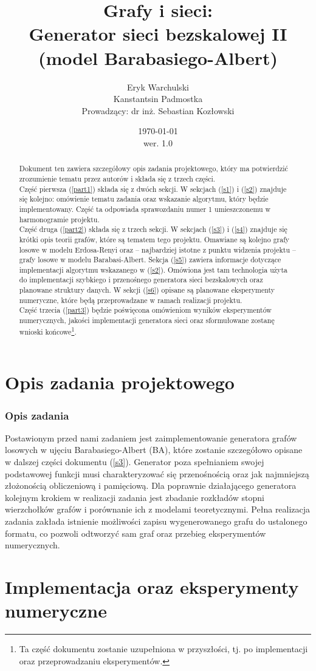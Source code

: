 \documentclass{article}
\title{Grafy i sieci: \\ Generator sieci bezskalowej II (model Barabasiego-Albert)}
\author{Eryk Warchulski \\ Kanstantsin Padmostka \\ Prowadzący: dr inż. Sebastian Kozłowski}%
\date{\today\\wer. 1.0}
\def\lecturemark{}
\newcommand{\spr}[1]{\part{#1}\def\lecturemark{\partname\ \thepart: #1}}
\renewcommand{\partname}{Sprawozdanie}
\renewcommand{\thepart}{\arabic{part}}
\begin{document}
\maketitle
{\footnotesize{\tableofcontents}}
\newpage
{}
\vspace*{\fill}
\begin{abstract}
	Dokument ten zawiera szczegółowy opis zadania projektowego, który ma potwierdzić zrozumienie tematu przez autorów i składa się z trzech części.\\
	Część pierwsza (\ref{part1}) składa się z dwóch sekcji. W sekcjach (\ref{s1}) i (\ref{s2}) znajduje się kolejno: omówienie tematu zadania oraz wskazanie algorytmu, który będzie implementowany. Część ta odpowiada sprawozdaniu numer 1 umieszczonemu w harmonogramie projektu. \\ 
	Część druga (\ref{part2}) składa się z trzech sekcji. W sekcjach (\ref{s3}) i (\ref{s4}) znajduje się krótki opis teorii grafów, które są
	tematem tego projektu. Omawiane są kolejno grafy losowe w modelu Erdosa-Renyi oraz -- najbardziej istotne z punktu widzenia projektu -- 
	grafy losowe w modelu Barabasi-Albert.
	Sekcja (\ref{s5}) zawiera informacje dotyczące implementacji algorytmu wskazanego w (\ref{s2}). Omówiona jest tam technologia użyta do implementacji
	szybkiego i przenośnego generatora sieci bezskalowych oraz planowane struktury danych. W sekcji (\ref{s6}) opisane są planowane eksperymenty
	numeryczne, które będą przeprowadzane w ramach realizacji projektu. \\
	Część trzecia (\ref{part3}) będzie poświęcona omówieniom wyników eksperymentów numerycznych, jakości implementacji generatora sieci oraz sformułowane zostanę wnioski końcowe\footnote{Ta część dokumentu zostanie uzupełniona w przyszłości, tj. po implementacji oraz przeprowadzaniu eksperymentów.}. 
\end{abstract}
\vspace*{\fill}
\newpage
\spr{Opis zadania projektowego \label{part1}}
\section{Opis zadania \label{s1}}
	Postawionym przed nami zadaniem jest zaimplementowanie generatora grafów losowych w ujęciu Barabasiego-Albert (BA), które zostanie szczegółowo
	opisane w dalszej części dokumentu (\ref{s3}). Generator poza spełnianiem swojej podstawowej funkcji musi charakteryzować się
	przenośnością oraz jak najmniejszą złożonością obliczeniową i pamięciową. Dla poprawnie działającego generatora kolejnym krokiem w realizacji
	zadania jest zbadanie rozkładów stopni wierzchołków grafów i porównanie ich z modelami teoretycznymi. Pełna realizacja zadania zakłada istnienie
	możliwości zapisu wygenerowanego grafu do ustalonego formatu, co pozwoli odtworzyć sam graf oraz przebieg eksperymentów numerycznych.\\
\newpage
\spr{Implementacja oraz eksperymenty numeryczne \label{part2}}
\end{document}
